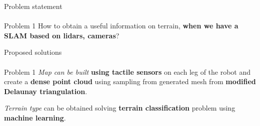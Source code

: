\documentclass[aspectratio=169,xcolor=table]{beamer}
\begin{document}

\begin{frame}[t]{Problem statement}
    \framesubtitle{}
    \begin{block}{Problem 1}
        \large
        How to obtain a useful information on terrain, \textbf{when we have a SLAM based on lidars, cameras}?
        \vspace{5pt}

    \end{block}
\end{frame}

\begin{frame}[t]{Proposed solutions}
    \framesubtitle{}
    \begin{exampleblock}{Problem 1}
        \large
        \textit{Map can be built} \textbf{using tactile sensors} on each leg of the robot and create a \textbf{dense point cloud} using sampling from generated mesh from \textbf{modified Delaunay triangulation}.
        \vspace{5pt}

        \textit{Terrain type} can be obtained solving \textbf{terrain classification} problem using \textbf{machine learning}.
    \end{exampleblock}
\end{frame}

\end{document}
